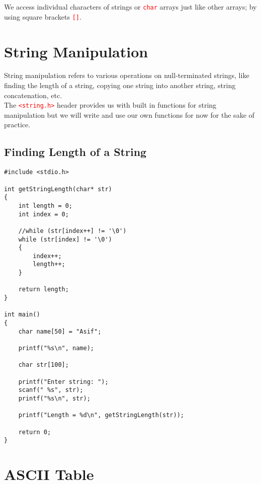 \documentclass[12pt]{article}
\begin{document}
We access individual characters of strings or \textcolor{red}{\texttt{char}} arrays just like other arrays; by using square brackets \textcolor{red}{\texttt{[]}}.   

\section*{String Manipulation}

\noindent String manipulation refers to various operations on null-terminated strings, like finding the length of a string, copying one string into another string, string concatenation, etc. \\

\noindent The \textcolor{red}{\texttt{<string.h>}} header provides us with built in functions for string manipulation but we will write and use our own functions for now for the sake of practice. \\ 

\subsection*{Finding Length of a String}

\begin{verbatim}
#include <stdio.h>

int getStringLength(char* str)
{
	int length = 0;
	int index = 0;
	
	//while (str[index++] != '\0')
	while (str[index] != '\0')
	{
		index++;
		length++;
	}
	
	return length;
}

int main()
{
	char name[50] = "Asif";
	
	printf("%s\n", name);
	
	char str[100];
	
	printf("Enter string: ");
	scanf(" %s", str);
	printf("%s\n", str);

	printf("Length = %d\n", getStringLength(str));

	return 0;
}

\end{verbatim}

\newpage
{}
\section*{ASCII Table}
\end{document}
